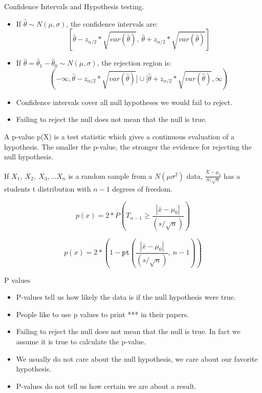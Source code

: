 \documentclass{beamer}
\numberwithin{equation}{section}
\begin{document}
\begin{frame}{Confidence Intervals and Hypothesis testing.}
\begin{itemize}
\item If $\hat{\theta}\sim N(\mu, \sigma)$, the confidence intervals are:
$$[\hat{\theta}-z_{\alpha/2} *\sqrt{var(\hat{\theta})},\ \hat{\theta}+z_{\alpha/2}*\sqrt{var(\hat{\theta})}]$$\pause
\item If $\hat{\theta} = \hat{\theta}_1-\hat{\theta}_0\sim N(\mu, \sigma)$, the rejection region is:
$$(-\infty, \hat{\theta}-z_{\alpha/2} *\sqrt{var(\hat{\theta})}]\cup [\hat{\theta}+z_{\alpha/2}*\sqrt{var(\hat{\theta})}, \infty)$$\pause
\item Confidence intervals cover all null hypotheses we would fail to reject.\pause
\item Failing to reject the null does not mean that the null is true.
\end{itemize}
\end{frame}

\begin{frame}
A p-value p(X) is a test statistic which gives a continuous evaluation of a hypothesis.  The smaller the p-value, the stronger the evidence for rejecting the null hypothesis.\pause

If $X_1,\ X_2,\ X_3,\ldots X_n$  is a random sample from a $N(\mu \sigma^2)$ data, $\frac{\bar{X}-\mu_0}{S/\sqrt{n}}$ has a students t distribution with $n-1$ degrees of freedom.

$$p(x)=2*P(T_{n-1} \geq \frac{|\bar{x}-\mu_0|}{(s/\sqrt{n})})$$\pause

$$p(x)=2*(1-\texttt{pt}(\frac{|\bar{x}-\mu_0|}{(s/\sqrt{n})},\ n-1))$$

\end{frame}




\begin{frame}{P values}
\begin{itemize}
\item P-values tell us how likely the data is if the null hypothesis were true.  \pause
\item People like to use p values to print *** in their papers.
\item Failing to reject the null does not mean that the null is true. In fact we assume it is true to calculate the p-value.\pause
\item We usually do not care about the null hypothesis, we care about our favorite hypothesis.\pause
\item P-values do not tell us how certain we are about a result.
\end{itemize}
\end{frame}
\end{document}
